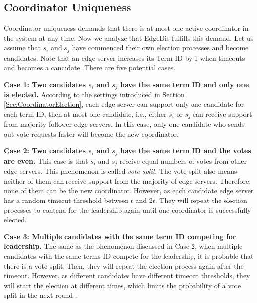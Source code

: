 \documentclass[10pt,journal,compsoc]{IEEEtran}
\begin{document}
\subsection{Coordinator Uniqueness}

\label{subSection:Safety_CoordinatorElection}
Coordinator uniqueness demands that there is at most one active coordinator in the system at any time. Now we analyze that EdgeDis fulfills this demand.  Let us assume that $s_i$ and $s_j$ have commenced their own election processes and become candidates. Note that an edge server increases its Term ID by 1 when timeouts and becomes a candidate.  There are five potential cases. %


\smallskip
\textbf{Case 1: Two candidates $s_i$ and $s_j$ have the same term ID and only one is elected.} According to the settings introduced in Section \ref{Sec:CoordinatorElection}, each edge server can support only one candidate for each term ID, then at most one candidate, i.e., either $s_i$ or $s_j$ can receive support from majority follower edge servers. In this case, only one candidate who sends out vote requests faster will become the new coordinator.

\smallskip
\textbf{Case 2: Two candidates $s_i$ and $s_j$ have the same term ID and the votes are even.} This case is that $s_i$ and $s_j$ receive equal numbers of votes from other edge servers. This phenomenon is called \textit{vote split}. The vote split also means neither of them can receive support from the majority of edge servers. Therefore, none of them can be the new coordinator. However, as each candidate edge server has a random timeout threshold between $t$ and $2t$. They will repeat the election processes to contend for the leadership again until one coordinator is successfully elected.

\smallskip
\textbf{Case 3: Multiple candidates with the same term ID competing for leadership.}  The same as the phenomenon discussed in Case 2, when multiple candidates with the same terms ID compete for the leadership, it is probable that there is a vote split. Then, they will repeat the election process again after the timeout. However, as different candidates have different timeout thresholds, they will start the election at different times, which limits the probability of a vote split in the next round \cite{ongaro2014Raft}.
\end{document}
